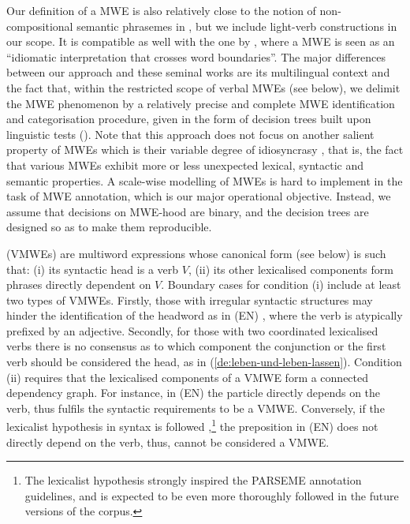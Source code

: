 \documentclass[output=paper,
modfonts,
]{langscibook}
\begin{document}
Our definition of a MWE is also relatively close to the notion of non-com\-po\-si\-tio\-nal semantic phrasemes in \citet{Melcuk10}, but we include light-verb constructions in our scope. It is compatible as well with the one by \citet{Sag2002a}, where a MWE is seen as an ``idiomatic interpretation that crosses word boundaries''. The major differences between our approach and these seminal works are its multilingual context and the fact that, within the restricted scope of verbal MWEs (see below), we delimit the MWE phenomenon by a relatively precise and complete MWE identification and categorisation procedure, given in the form of decision trees built upon linguistic tests (). Note that this approach does not focus on another salient property of MWEs which is their variable degree of idiosyncrasy \citep{GastonGross88}, that is, the fact that various MWEs exhibit more or less unexpected lexical, syntactic and semantic properties. A scale-wise modelling of MWEs is hard to implement in the task of MWE annotation, which is our major operational objective. Instead, we assume that decisions on MWE-hood are binary, and the decision trees are designed so as to make them reproducible. 

 (VMWEs) are multiword expressions whose canonical form (see below) is such that: (i) its syntactic head is a verb $V$, (ii) its other lexicalised components form phrases directly dependent on $V$. Boundary cases for condition (i) include at least two types of VMWEs. Firstly, those with irregular syntactic structures may hinder the identification of the headword as in (EN) , where the verb is atypically prefixed by an adjective. Secondly, for those with two coordinated lexicalised verbs there is no consensus as to which component \textendash the conjunction or the first verb \textendash  should be considered the head, as in (\ref{de:leben-und-leben-lassen}).
Condition (ii) requires that the lexicalised components of a VMWE form a connected dependency graph. For instance, in (EN)  the particle  directly depends on the verb, thus  fulfils the syntactic requirements to be a VMWE. Conversely, if the lexicalist hypothesis in syntax is followed \citep{DEMARNEFFE14.1062},\footnote{The lexicalist hypothesis strongly inspired the PARSEME annotation guidelines, and is expected to be even more thoroughly followed in the future versions of the corpus.} the preposition  in (EN)  does not directly depend on the verb, thus,  cannot be considered a VMWE.
\end{document}
